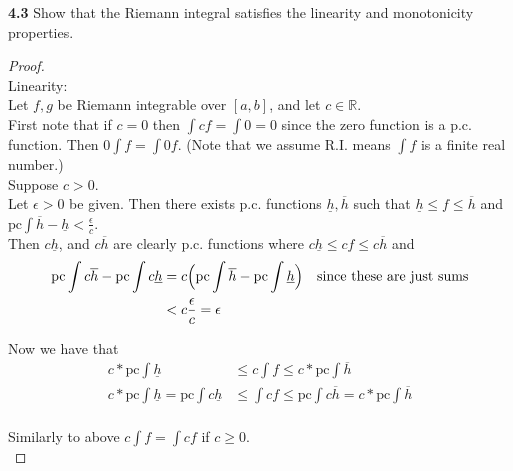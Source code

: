 \documentclass[12pt]{article}
\begin{document}
\hspace{-4 ex}\textbf{4.3} Show that the Riemann integral satisfies the linearity and monotonicity properties. \bigbreak

	\begin{proof}  \text{ }\\
		Linearity: \\
		
		Let $f,g$ be Riemann integrable over $[a,b]$, and let $c \in \mathbb{R}$. \\
		
		First note that if $c=0$ then $\int cf = \int 0 = 0$ since the zero function is a p.c. function. Then $0 \int f = \int 0 f$. (Note that we assume R.I. means $\int f$ is a finite real number.)\\
		Suppose $c > 0$. \\
		Let $\epsilon > 0$ be given. Then there exists p.c. functions $\underline{h}, \overline{h}$ such that $\underline{h} \leq f \leq \overline{h}$ and $\text{pc}\int \overline{h} - \underline{h} < \frac{\epsilon}{c}$. \\
		Then $c\underline{h}$, and $c\overline{h}$ are clearly p.c. functions where $c\underline{h} \leq cf \leq c\overline{h}$ and \\
		\begin{align*}
			\text{pc}\int c \overline{h} - \text{pc}\int c \underline{h} &  = c \Big(\text{pc}\int  \overline{h} - \text{pc}\int \underline{h} \Big) \text{\space \space \space since these are just sums}\\
			& < c \frac{\epsilon}{c} = \epsilon \\
		\end{align*}
		
		Now we have that\\
		\begin{align*}
			c *\text{pc}\int \underline{h} & \leq c \int f \leq c * \text{pc}\int \overline{h}  \\
			c *\text{pc}\int \underline{h} = \text{pc}\int c\underline{h} & \leq \int cf \leq \text{pc}\int c\overline{h} = c * \text{pc}\int \overline{h} \\
		\end{align*}
		
		Similarly to above $c \int f = \int cf$ if $c \geq 0$. \\
		

\end{proof}
\end{document}
